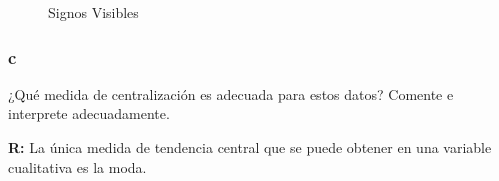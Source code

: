 \documentclass{templateNote}
\begin{document}
\begin{figure}[H]
    \begin{center}
        \caption{Signos Visibles}
    \end{center}
\end{figure}


\subsubsection{c}
\indent
¿Qué medida de centralización es adecuada para estos datos? Comente e interprete adecuadamente.

\textbf{R:} La única medida de tendencia central que se puede obtener en una variable cualitativa
es la moda.
\end{document}
